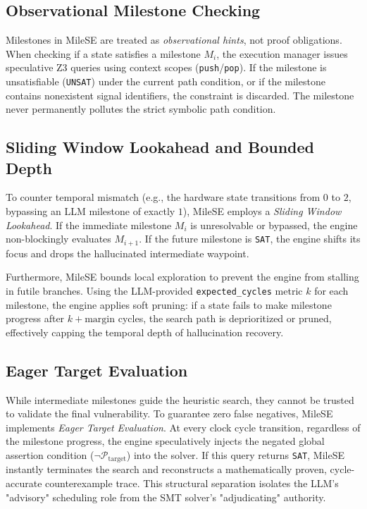 \subsection{Observational Milestone Checking}
Milestones in MileSE are treated as \textit{observational hints}, not proof obligations. When checking if a state satisfies a milestone $M_i$, the execution manager issues speculative Z3 queries using context scopes (\texttt{push}/\texttt{pop}). If the milestone is unsatisfiable (\texttt{UNSAT}) under the current path condition, or if the milestone contains nonexistent signal identifiers, the constraint is discarded. The milestone never permanently pollutes the strict symbolic path condition.

\subsection{Sliding Window Lookahead and Bounded Depth}
To counter temporal mismatch (e.g., the hardware state transitions from $0$ to $2$, bypassing an LLM milestone of exactly $1$), MileSE employs a \textit{Sliding Window Lookahead}. If the immediate milestone $M_{i}$ is unresolvable or bypassed, the engine non-blockingly evaluates $M_{i+1}$. If the future milestone is \texttt{SAT}, the engine shifts its focus and drops the hallucinated intermediate waypoint.

Furthermore, MileSE bounds local exploration to prevent the engine from stalling in futile branches. Using the LLM-provided \texttt{expected\_cycles} metric $k$ for each milestone, the engine applies soft pruning: if a state fails to make milestone progress after $k + \text{margin}$ cycles, the search path is deprioritized or pruned, effectively capping the temporal depth of hallucination recovery.

\subsection{Eager Target Evaluation}
While intermediate milestones guide the heuristic search, they cannot be trusted to validate the final vulnerability. To guarantee zero false negatives, MileSE implements \textit{Eager Target Evaluation}. At every clock cycle transition, regardless of the milestone progress, the engine speculatively injects the negated global assertion condition ($\neg \mathcal{P}_{\text{target}}$) into the solver. If this query returns \texttt{SAT}, MileSE instantly terminates the search and reconstructs a mathematically proven, cycle-accurate counterexample trace. This structural separation isolates the LLM's "advisory" scheduling role from the SMT solver's "adjudicating" authority.
